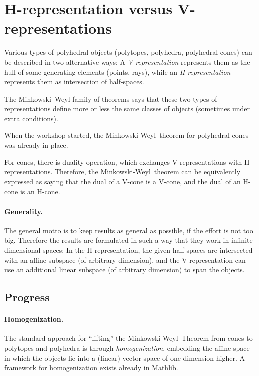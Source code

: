 \documentclass[a4paper,11pt]{article}
\newcommand\MW{Minkowski-Weyl}
\begin{document}
\section{H-representation versus V-representations}
\label{sec:h-versus-v}



Various types of polyhedral objects (polytopes, polyhedra, polyhedral
cones)
can be described in two alternative ways:
A \emph{V-representation} represents them as the hull
of some generating elements (points, rays), while
an \emph{H-representation} represents them as intersection of half-spaces.

The Minkowski--Weyl family of theorems says that these two types of
representations define more or less the same classes of objects
(sometimes under extra conditions).


When the workshop started, the \MW\ theorem for polyhedral cones was already in
place.

For cones, there is duality operation, which
exchanges
V-representations with H-representations.
Therefore, the \MW\ theorem can be
equivalently expressed as saying that
the dual of a V-cone is a
V-cone, 
and the dual of an H-cone is an H-cone.


\paragraph{Generality.}
The general motto is to keep results as general as possible,
if the effort is not too big.
Therefore the results are formulated in such a way that they 
work in infinite-dimensional spaces:
In the H-representation, the given half-spaces are intersected with an
affine
subspace (of arbitrary dimension), and the V-representation can use
an 
additional linear
subspace (of arbitrary dimension)
to span the objects.

\subsection{Progress}
\label{sec:progress}

\paragraph{Homogenization.}
The standard approach
for ``lifting'' the \MW\ Theorem from cones to polytopes and polyhedra
is through \emph{homogenization}, embedding the
affine space in which the objects lie into a (linear) vector space of
one dimension higher.
A framework for homogenization exists already in Mathlib.
\end{document}
